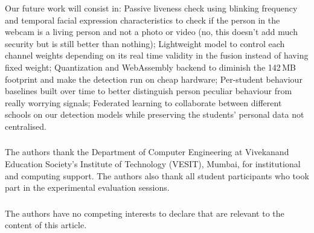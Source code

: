 \documentclass[runningheads]{llncs}
\begin{document}
Our future work will consist in: Passive liveness check using blinking frequency and temporal facial expression characteristics to check if the person in the webcam is a living person and not a photo or video (no, this doesn't add much security but is still better than nothing); Lightweight model to control each channel weights depending on its real time validity in the fusion instead of having fixed weight; Quantization and WebAssembly backend to diminish the 142\,MB footprint and make the detection run on cheap hardware; Per-student behaviour baselines built over time to better distinguish person peculiar behaviour from really worrying signals; Federated learning to collaborate between different schools on our detection models while preserving the students' personal data not centralised.

\begin{credits}
\subsubsection{\ackname}
The authors thank the Department of Computer Engineering at Vivekanand Education Society's Institute of Technology (VESIT), Mumbai, for institutional and computing support. The authors also thank all student participants who took part in the experimental evaluation sessions.

\subsubsection{\discintname}
The authors have no competing interests to declare that are relevant to the content of this article.
\end{credits}
\end{document}
